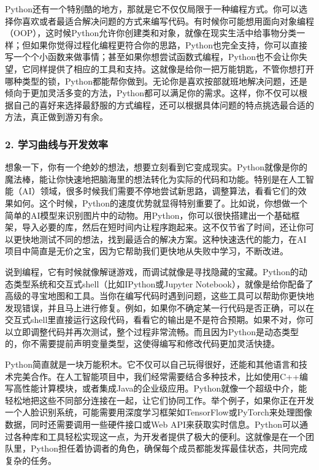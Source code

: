 Python还有一个特别酷的地方，那就是它不仅仅局限于一种编程方式。你可以选择你喜欢或者最适合解决问题的方式来编写代码。有时候你可能想用面向对象编程（OOP），这时候Python允许你创建类和对象，就像在现实生活中给事物分类一样；但如果你觉得过程化编程更符合你的思路，Python也完全支持，你可以直接写一个个小函数来做事情；甚至如果你想尝试函数式编程，Python也不会让你失望，它同样提供了相应的工具和支持。这就像是给你一把万能钥匙，不管你想打开哪种类型的锁，Python都能帮你做到。无论你是喜欢按部就班地解决问题，还是倾向于更加灵活多变的方法，Python都可以满足你的需求。这样，你不仅可以根据自己的喜好来选择最舒服的方式编程，还可以根据具体问题的特点挑选最合适的方法，真正做到游刃有余。


\subsubsection{2. 学习曲线与开发效率}

想象一下，你有一个绝妙的想法，想要立刻看到它变成现实。Python就像是你的魔法棒，能让你快速地把脑海里的想法转化为实际的代码和功能。特别是在人工智能（AI）领域，很多时候我们需要不停地尝试新思路，调整算法，看看它们的效果如何。这个时候，Python的速度优势就显得特别重要了。比如说，你想做一个简单的AI模型来识别图片中的动物。用Python，你可以很快搭建出一个基础框架，导入必要的库，然后在短时间内让程序跑起来。这不仅节省了时间，还让你可以更快地测试不同的想法，找到最适合的解决方案。这种快速迭代的能力，在AI项目中简直是无价之宝，因为它帮助我们更快地从失败中学习，不断改进。

说到编程，它有时候就像解谜游戏，而调试就像是寻找隐藏的宝藏。Python的动态类型系统和交互式shell（比如IPython或Jupyter Notebook），就像是给你配备了高级的寻宝地图和工具。当你在编写代码时遇到问题，这些工具可以帮助你更快地发现错误，并且马上进行修复。例如，如果你不确定某一行代码是否正确，可以在交互式shell里直接运行这段代码，看看它的输出是不是符合预期。如果不对，你可以立即调整代码并再次测试，整个过程非常流畅。而且因为Python是动态类型的，你不需要提前声明变量类型，这使得编写和修改代码更加灵活快捷。

Python简直就是一块万能积木。它不仅可以自己玩得很好，还能和其他语言和技术完美合作。在人工智能项目中，我们经常需要结合多种技术，比如使用C++编写高性能计算模块，或者集成Java的企业级应用。Python就像一个超级中介，能轻松地把这些不同部分连接在一起，让它们协同工作。举个例子，如果你正在开发一个人脸识别系统，可能需要用深度学习框架如TensorFlow或PyTorch来处理图像数据，同时还需要调用一些硬件接口或Web API来获取实时信息。Python可以通过各种库和工具轻松实现这一点，为开发者提供了极大的便利。这就像是在一个团队里，Python担任着协调者的角色，确保每个成员都能发挥最佳状态，共同完成复杂的任务。

